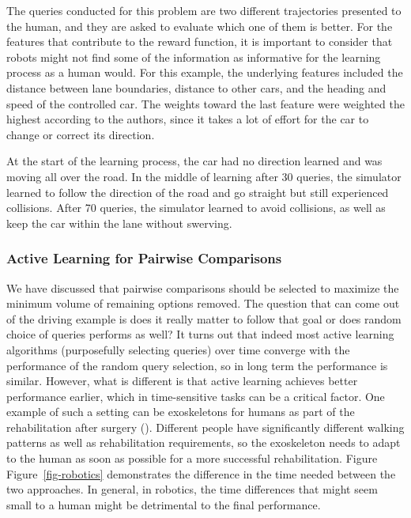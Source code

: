 \documentclass[
  letterpaper,
  numbers=noenddot,
  DIV=11]{scrreprt}
\theoremstyle{definition}
\theoremstyle{plain}
\theoremstyle{plain}
\theoremstyle{remark}
\begin{document}
The queries conducted for this problem are two different trajectories
presented to the human, and they are asked to evaluate which one of them
is better. For the features that contribute to the reward function, it
is important to consider that robots might not find some of the
information as informative for the learning process as a human would.
For this example, the underlying features included the distance between
lane boundaries, distance to other cars, and the heading and speed of
the controlled car. The weights toward the last feature were weighted
the highest according to the authors, since it takes a lot of effort for
the car to change or correct its direction.

At the start of the learning process, the car had no direction learned
and was moving all over the road. In the middle of learning after 30
queries, the simulator learned to follow the direction of the road and
go straight but still experienced collisions. After 70 queries, the
simulator learned to avoid collisions, as well as keep the car within
the lane without swerving.

\subsubsection*{Active Learning for Pairwise
Comparisons}\label{active-learning-for-pairwise-comparisons}

We have discussed that pairwise comparisons should be selected to
maximize the minimum volume of remaining options removed. The question
that can come out of the driving example is does it really matter to
follow that goal or does random choice of queries performs as well? It
turns out that indeed most active learning algorithms (purposefully
selecting queries) over time converge with the performance of the random
query selection, so in long term the performance is similar. However,
what is different is that active learning achieves better performance
earlier, which in time-sensitive tasks can be a critical factor. One
example of such a setting can be exoskeletons for humans as part of the
rehabilitation after surgery ().
Different people have significantly different walking patterns as well
as rehabilitation requirements, so the exoskeleton needs to adapt to the
human as soon as possible for a more successful rehabilitation. Figure
Figure~\ref{fig-robotics} demonstrates the difference in the time needed
between the two approaches. In general, in robotics, the time
differences that might seem small to a human might be detrimental to the
final performance.
\end{document}
